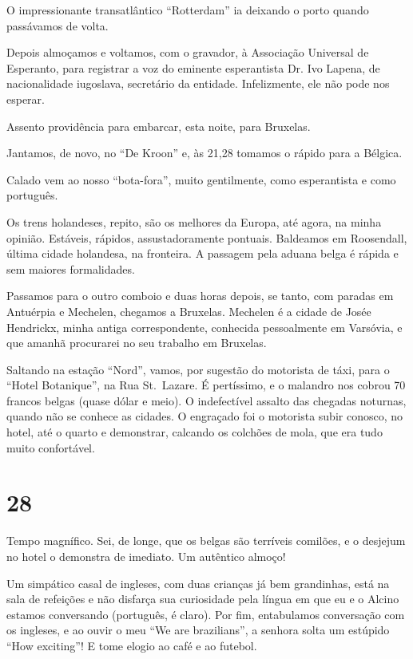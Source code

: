 O impressionante transatlântico ``Rotterdam'' ia deixando o porto quando passávamos de volta.

Depois almoçamos e voltamos, com o gravador, à Associação Universal de Esperanto, para registrar a voz do eminente esperantista Dr. Ivo Lapena, de nacionalidade iugoslava, secretário da entidade. Infelizmente, ele não pode nos esperar.

Assento providência para embarcar, esta noite, para Bruxelas.

Jantamos, de novo, no ``De Kroon'' e, às 21,28 tomamos o rápido para a Bélgica.

Calado vem ao nosso ``bota-fora'', muito gentilmente, como esperantista e como português.

Os trens holandeses, repito, são os melhores da Europa, até agora, na minha opinião. Estáveis, rápidos, assustadoramente pontuais. Baldeamos em Roosendall, última cidade holandesa, na fronteira. A passagem pela aduana belga é rápida e sem maiores formalidades.

Passamos para o outro comboio e duas horas depois, se tanto, com paradas em Antuérpia e Mechelen, chegamos a Bruxelas. Mechelen é a cidade de Josée Hendrickx, minha antiga correspondente, conhecida pessoalmente em Varsóvia, e que amanhã procurarei no seu trabalho em Bruxelas.

Saltando na estação ``Nord'', vamos, por sugestão do motorista de táxi, para o ``Hotel Botanique'', na Rua St.~Lazare. É pertíssimo, e o malandro nos cobrou 70 francos belgas (quase dólar e meio). O indefectível assalto das chegadas noturnas, quando não se conhece as cidades. O engraçado foi o motorista subir conosco, no hotel, até o quarto e demonstrar, calcando os colchões de mola, que era tudo muito confortável.

\section*{28 \adfflatleafright {}}
Tempo magnífico. Sei, de longe, que os belgas são terríveis comilões, e o desjejum no hotel o demonstra de imediato. Um autêntico almoço!

Um simpático casal de ingleses, com duas crianças já bem grandinhas, está na sala de refeições e não disfarça sua curiosidade pela língua em que eu e o Alcino estamos conversando (português, é claro). Por fim, entabulamos conversação com os ingleses, e ao ouvir o meu ``We are brazilians'', a senhora solta um estúpido ``How exciting''! E tome elogio ao café e ao futebol.

